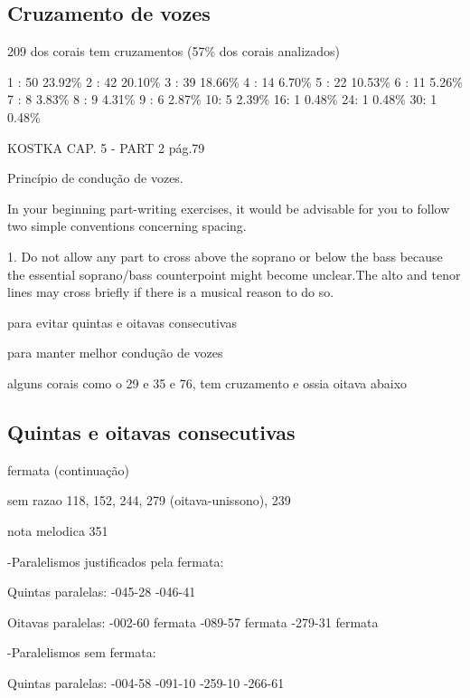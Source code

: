 \documentclass{article}
\begin{document}
\subsection{Cruzamento de vozes}
\label{sec:cruzamento-de-vozes}

209 dos corais tem cruzamentos (57\% dos corais analizados)

1 : 50  23.92\%
2 : 42  20.10\%
3 : 39  18.66\%
4 : 14  6.70\%
5 : 22  10.53\%
6 : 11  5.26\%
7 : 8   3.83\%
8 : 9   4.31\%
9 : 6   2.87\%
10: 5   2.39\%
16: 1   0.48\%
24: 1   0.48\%
30: 1   0.48\%

KOSTKA CAP. 5 - PART 2  pág.79
 
Princípio de condução de vozes.
 
In your beginning part-writing exercises, it would be advisable for you to follow two simple conventions concerning
spacing.
 
1. Do not allow any part to cross above the soprano or below the bass because the essential soprano/bass counterpoint
might become unclear.The alto and tenor lines may cross briefly if there is a musical reason to do so.
 

para evitar quintas e oitavas consecutivas

para manter melhor condução de vozes

alguns corais como o 29 e 35 e 76, tem cruzamento e ossia oitava abaixo

\subsection{Quintas e oitavas consecutivas}
\label{sec:quintas-e-oitavas}

fermata (continuação)

sem razao 118, 152, 244, 279 (oitava-unissono), 239

nota melodica 351

-Paralelismos justificados pela fermata:
 
Quintas paralelas:
-045-28 
-046-41 
 
Oitavas paralelas:
-002-60  fermata
-089-57  fermata
-279-31  fermata
 
-Paralelismos sem fermata:
 
Quintas paralelas:
-004-58 
-091-10 
-259-10 
-266-61 
 
\end{document}
